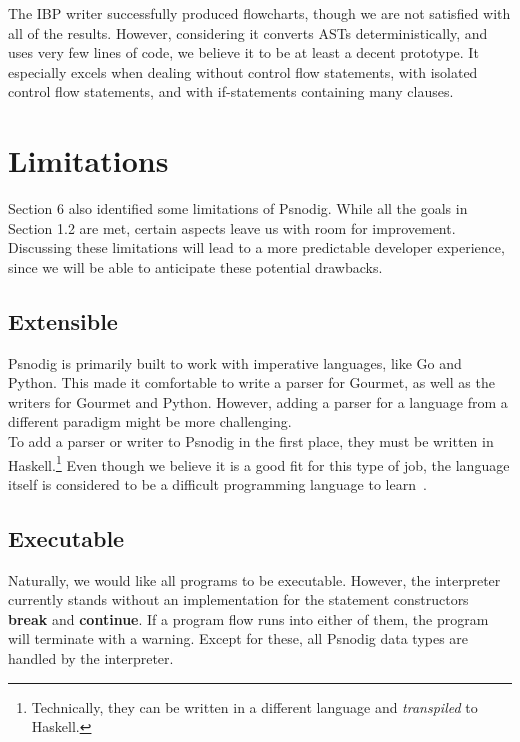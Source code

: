 The IBP writer successfully produced flowcharts, though we are not satisfied with all of the results. However, considering it converts ASTs deterministically, and uses very few lines of code, we believe it to be at least a decent prototype. It especially excels when dealing without control flow statements, with isolated control flow statements, and with if-statements containing many clauses.

\section{Limitations}

Section 6 also identified some limitations of Psnodig. While all the goals in Section 1.2 are met, certain aspects leave us with room for improvement. Discussing these limitations will lead to a more predictable developer experience, since we will be able to anticipate these potential drawbacks.

\subsection{Extensible}

Psnodig is primarily built to work with imperative languages, like Go and Python. This made it comfortable to write a parser for Gourmet, as well as the writers for Gourmet and Python. However, adding a parser for a language from a different paradigm might be more challenging. \\

To add a parser or writer to Psnodig in the first place, they must be written in Haskell.\footnote{Technically, they can be written in a different language and \textit{transpiled} to Haskell.} Even though we believe it is a good fit for this type of job, the language itself is considered to be a difficult programming language to learn~\cite{haskellIsHard1}.

\subsection{Executable}

Naturally, we would like all programs to be executable. However, the interpreter currently stands without an implementation for the statement constructors \textbf{break} and \textbf{continue}. If a program flow runs into either of them, the program will terminate with a warning. Except for these, all Psnodig data types are handled by the interpreter. \\

